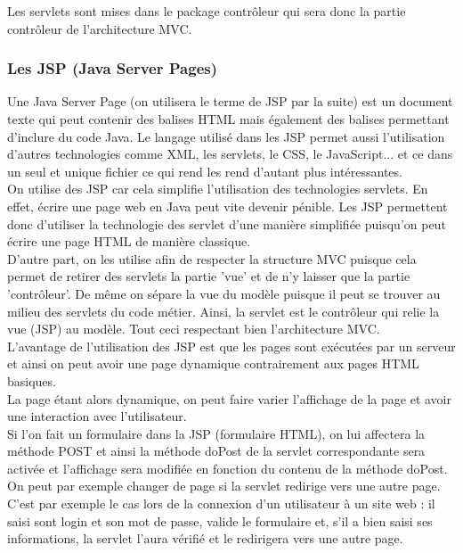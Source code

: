Les servlets sont mises dans le package contrôleur qui sera donc la partie contrôleur de l'architecture MVC.

\subsubsection{Les JSP (Java Server Pages)}
Une Java Server Page (on utilisera le terme de JSP par la suite) est un document texte qui peut contenir des balises HTML mais également des balises permettant d'inclure du code Java. Le langage utilisé dans les JSP permet aussi l'utilisation d'autres technologies comme XML, les servlets, le CSS, le JavaScript... et ce dans un seul et unique fichier ce qui rend les rend d'autant plus intéressantes.\\

On utilise des JSP car cela simplifie l'utilisation des technologies servlets. En effet, écrire une page web en Java peut vite devenir pénible. Les JSP permettent donc d'utiliser la technologie des servlet d'une manière simplifiée puisqu'on peut écrire une page HTML de manière classique.\\

D'autre part, on les utilise afin de respecter la structure MVC puisque cela permet de retirer des servlets la partie 'vue' et de n'y laisser que la partie 'contrôleur'. De même on sépare la vue du modèle puisque il peut se trouver au milieu des servlets du code métier. Ainsi, la servlet est le contrôleur qui relie la vue (JSP) au modèle. Tout ceci respectant bien l'architecture MVC.\\

L'avantage de l'utilisation des JSP est que les pages sont exécutées par un serveur et ainsi on peut avoir une page dynamique contrairement aux pages HTML basiques.\\

La page étant alors dynamique, on peut faire varier l'affichage de la page et avoir une interaction avec l'utilisateur.\\

Si l'on fait un formulaire dans la JSP (formulaire HTML), on lui affectera la méthode POST et ainsi la méthode doPost de la servlet correspondante sera activée et l'affichage sera modifiée en fonction du contenu de la méthode doPost. On peut par exemple changer de page si la servlet redirige vers une autre page. C'est par exemple le cas lors de la connexion d'un utilisateur à un site web : il saisi sont login et son mot de passe, valide le formulaire et, s'il a bien saisi ses informations, la servlet l'aura vérifié et le redirigera vers une autre page.\\

